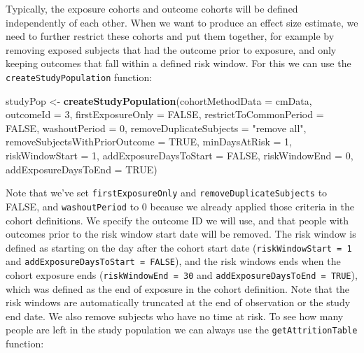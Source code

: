 \documentclass[]{book}
\newenvironment{Shaded}{\begin{snugshade}}{\end{snugshade}}
\newcommand{\KeywordTok}[1]{\textcolor[rgb]{0.13,0.29,0.53}{\textbf{#1}}}
\newcommand{\DataTypeTok}[1]{\textcolor[rgb]{0.13,0.29,0.53}{#1}}
\newcommand{\DecValTok}[1]{\textcolor[rgb]{0.00,0.00,0.81}{#1}}
\newcommand{\StringTok}[1]{\textcolor[rgb]{0.31,0.60,0.02}{#1}}
\newcommand{\OtherTok}[1]{\textcolor[rgb]{0.56,0.35,0.01}{#1}}
\newcommand{\NormalTok}[1]{#1}
\begin{document}
Typically, the exposure cohorts and outcome cohorts will be defined
independently of each other. When we want to produce an effect size
estimate, we need to further restrict these cohorts and put them
together, for example by removing exposed subjects that had the outcome
prior to exposure, and only keeping outcomes that fall within a defined
risk window. For this we can use the \texttt{createStudyPopulation}
function:

\begin{Shaded}
\begin{Highlighting}[]
\NormalTok{studyPop <-}\StringTok{ }\KeywordTok{createStudyPopulation}\NormalTok{(}\DataTypeTok{cohortMethodData =}\NormalTok{ cmData,}
                                  \DataTypeTok{outcomeId =} \DecValTok{3}\NormalTok{,}
                                  \DataTypeTok{firstExposureOnly =} \OtherTok{FALSE}\NormalTok{,}
                                  \DataTypeTok{restrictToCommonPeriod =} \OtherTok{FALSE}\NormalTok{,}
                                  \DataTypeTok{washoutPeriod =} \DecValTok{0}\NormalTok{,}
                                  \DataTypeTok{removeDuplicateSubjects =} \StringTok{"remove all"}\NormalTok{,}
                                  \DataTypeTok{removeSubjectsWithPriorOutcome =} \OtherTok{TRUE}\NormalTok{,}
                                  \DataTypeTok{minDaysAtRisk =} \DecValTok{1}\NormalTok{,}
                                  \DataTypeTok{riskWindowStart =} \DecValTok{1}\NormalTok{,}
                                  \DataTypeTok{addExposureDaysToStart =} \OtherTok{FALSE}\NormalTok{,}
                                  \DataTypeTok{riskWindowEnd =} \DecValTok{0}\NormalTok{,}
                                  \DataTypeTok{addExposureDaysToEnd =} \OtherTok{TRUE}\NormalTok{)}
\end{Highlighting}
\end{Shaded}

Note that we've set \texttt{firstExposureOnly} and
\texttt{removeDuplicateSubjects} to FALSE, and \texttt{washoutPeriod} to
0 because we already applied those criteria in the cohort definitions.
We specify the outcome ID we will use, and that people with outcomes
prior to the risk window start date will be removed. The risk window is
defined as starting on the day after the cohort start date
(\texttt{riskWindowStart\ =\ 1} and
\texttt{addExposureDaysToStart\ =\ FALSE}), and the risk windows ends
when the cohort exposure ends (\texttt{riskWindowEnd\ =\ 30} and
\texttt{addExposureDaysToEnd\ =\ TRUE}), which was defined as the end of
exposure in the cohort definition. Note that the risk windows are
automatically truncated at the end of observation or the study end date.
We also remove subjects who have no time at risk. To see how many people
are left in the study population we can always use the
\texttt{getAttritionTable} function:
\end{document}
